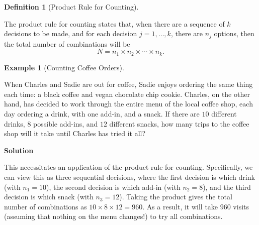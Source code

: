 \documentclass[
  letterpaper,
  DIV=11,
  numbers=noendperiod]{scrreprt}
\theoremstyle{definition}
\theoremstyle{definition}
\newtheorem{example}{Example}[chapter]
\theoremstyle{definition}
\newtheorem{definition}{Definition}[chapter]
\theoremstyle{remark}
\begin{document}
\begin{definition}[Product Rule for
Counting]\protect\hypertarget{def-product-rule-count}{}\label{def-product-rule-count}

The product rule for counting states that, when there are a sequence of
\(k\) decisions to be made, and for each decision \(j=1,\dots,k\), there
are \(n_j\) options, then the total number of combinations will be
\[N = n_1\times n_2\times\cdots\times n_k.\]

\end{definition}

\begin{example}[Counting Coffee
Orders]\protect\hypertarget{exm-counting-coffee-orders}{}\label{exm-counting-coffee-orders}

When Charles and Sadie are out for coffee, Sadie enjoys ordering the
same thing each time: a black coffee and vegan chocolate chip cookie.
Charles, on the other hand, has decided to work through the entire menu
of the local coffee shop, each day ordering a drink, with one add-in,
and a snack. If there are \(10\) different drinks, \(8\) possible
add-ins, and \(12\) different snacks, how many trips to the coffee shop
will it take until Charles has tried it all?

\begin{tcolorbox}[enhanced jigsaw, colback=white, colframe=quarto-callout-color-frame, arc=.35mm, leftrule=.75mm, rightrule=.15mm, opacityback=0, breakable, bottomrule=.15mm, left=2mm, toprule=.15mm]

\vspace{-3mm}\textbf{Solution}\vspace{3mm}

This necessitates an application of the product rule for counting.
Specifically, we can view this as three sequential decisions, where the
first decision is which drink (with \(n_1 = 10\)), the second decision
is which add-in (with \(n_2 = 8\)), and the third decision is which
snack (with \(n_3 = 12\)). Taking the product gives the total number of
combinations as \(10\times 8\times 12 = 960\). As a result, it will take
\(960\) visits (assuming that nothing on the menu changes!) to try all
combinations.

\end{tcolorbox}

\end{example}
\end{document}

